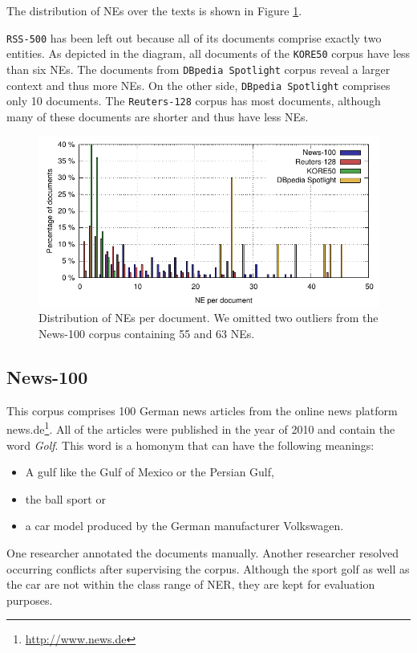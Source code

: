 \documentclass[10pt, a4paper]{article}
\begin{document}
The distribution of NEs over the texts is shown in Figure \ref{fig:nePerDoc}. 

\texttt{RSS-500} has been left out because all of its documents comprise exactly two entities. 
As depicted in the diagram, all documents of the \texttt{KORE50} corpus have less than six NEs. 
The documents from \texttt{DBpedia Spotlight} corpus reveal a larger context and thus more NEs. 
On the other side, \texttt{DBpedia Spotlight} comprises only 10 documents.
The \texttt{Reuters-128} corpus has most documents, although many of these documents are shorter and thus have less NEs.

\begin{figure}[tb!]
  \centering
  \includegraphics[width=\linewidth]{NE_per_doc.pdf}
  \caption{Distribution of NEs per document. We omitted two outliers from the News-100 corpus containing 55 and 63 NEs.}
  \label{fig:nePerDoc}
\end{figure}


\subsection{News-100}

This corpus comprises 100 German news articles from the online news platform news.de\footnote{\url{http://www.news.de}}. 
All of the articles were published in the year of 2010 and contain the word \emph{Golf}.
This word is a homonym that can have the following meanings:
\begin{itemize}
\item A gulf like the Gulf of Mexico or the Persian Gulf,
\item the ball sport or
\item a car model produced by the German manufacturer Volkswagen.
\end{itemize}

One researcher annotated the documents manually.
Another researcher resolved occurring conflicts after supervising the corpus.
Although the sport golf as well as the car are not within the class range of NER, they are kept for evaluation purposes.
\end{document}
